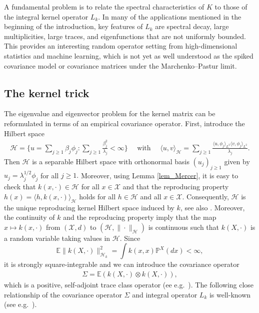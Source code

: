 \documentclass[a4paper,11pt]{article} %
\numberwithin{equation}{section}
\theoremstyle{definition}
\theoremstyle{remark}
\theoremstyle{plain}
\begin{document}
A fundamental problem is to relate the spectral characteristics of \( K \) to those of the integral kernel operator $ L_k$. 
In many of the applications mentioned in the beginning of the introduction, key features of $L_k$ are spectral decay, large multiplicities, large traces, and eigenfunctions that are not uniformly bounded. 
This provides an interesting random operator setting from high-dimensional statistics and machine learning, which is not yet as well understood as the spiked covariance model or covariance matrices under the Marchenko--Pastur limit.


\subsection{The kernel trick}%
\label{ssec_TheKernelTrick}

The eigenvalue and eigenvector problem for the kernel matrix can be reformulated in terms of an empirical covariance operator. First, introduce the Hilbert space
\begin{align}\label{eq:RKHS}
    \mathcal{H}
  = 
    \Big\{ u=\sum_{j \geq 1}\beta_{j} \phi_{j}: 
           \sum_{j \geq  1} \frac{ \beta_{j}^{2} }{ \lambda_{j} } 
         < \infty
    \Big\}
  \quad \text{ with } \quad 
  \langle u, v \rangle_{ \mathcal{H} } 
  = 
  \sum_{j \geq 1}
  \frac{ \langle u, \phi_{j} \rangle_{ L^{2} } 
         \langle v, \phi_{j} \rangle_{ L^{2} }
       }
       { \lambda_{j} }.
\end{align}
Then $\mathcal{H}$ is a separable Hilbert space with orthonormal basis $(u_j)_{j\geq 1}$ given by $u_j=\lambda_j^{1/2}\phi_j$ for all $j\geq 1.$ 
Moreover, using Lemma \ref{lem_Mercer}, it is easy to check that $ k(x, \cdot) \in \mathcal{H} $ for all $ x \in \mathcal{X} $ and that the reproducing property $ h(x)=\langle h, k(x,\cdot) \rangle_{\mathcal{H}} $ holds for all $ h \in \mathcal{H} $ and all $ x \in \mathcal{X} $.
Consequently, \( \mathcal{H} \) is the unique reproducing kernel Hilbert space induced by \( k \), see also \cite{SteinwartChristmann2008SVMs, Wainwright2019HDStats}.
Moreover, the continuity of \( k \) and the reproducing property imply that the map $ x \mapsto k(x,\cdot)$  from $(\mathcal{X},d)$ to $(\mathcal{H},\|\cdot\|_\mathcal{H})$ is continuous such that $ k(X, \cdot) $ is a random variable taking values in $ \mathcal{H} $.
Since 
\[
  \mathbb{E}\|k(X,\cdot)\|_{\mathcal{H}_k}^2
  =
  \int k(x, x) \mathbb{P}^{X}(d x) < \infty,
\]
it is strongly square-integrable and we can introduce the covariance operator
\begin{align}
  \Sigma = \mathbb{E}(k(X,\cdot) \otimes k(X,\cdot)),
\end{align}
which is a positive, self-adjoint trace class operator (ee e.g.~\cite[Theorem 7.2.5]{HE15}). The following close relationship of the covariance operator $\Sigma$ and integral operator $L_k$ is well-known (see e.g.~\cite[Theorem 4.1]{MR2177937}).
\end{document}
